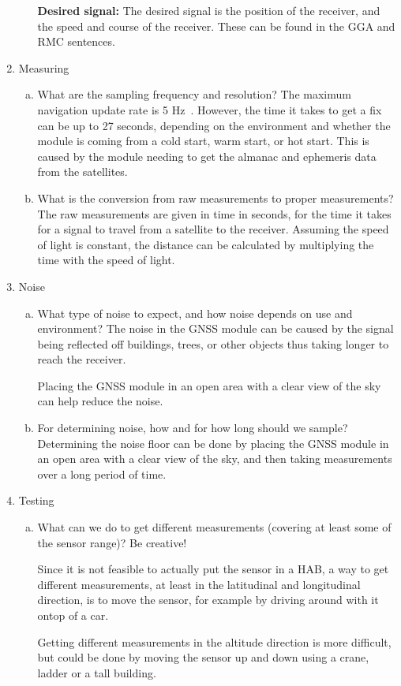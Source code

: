 \begin{enumerate}
\begin{enumerate}[(a)]
        \textbf{Desired signal:}
        The desired signal is the position of the receiver, and the speed and course of the receiver.
        These can be found in the GGA and RMC sentences.
    \end{enumerate}
    \item Measuring
    \begin{enumerate}[(a)]
        \item What are the sampling frequency and resolution?
        The maximum navigation update rate is 5 Hz~\cite{neo-6m}.
        However, the time it takes to get a fix can be up to 27 seconds, depending on the environment and whether the module is coming from a cold start, warm start, or hot start.
        This is caused by the module needing to get the almanac and ephemeris data from the satellites.

        \item What is the conversion from raw measurements to proper measurements?
        The raw measurements are given in time in seconds, for the time it takes for a signal to travel from a satellite to the receiver.
        Assuming the speed of light is constant, the distance can be calculated by multiplying the time with the speed of light.

    \end{enumerate}
    \item Noise
    \begin{enumerate}[(a)]
        \item What type of noise to expect, and how noise depends on use and environment?
        The noise in the GNSS module can be caused by the signal being reflected off buildings, trees, or other objects thus taking longer to reach the receiver.

        Placing the GNSS module in an open area with a clear view of the sky can help reduce the noise.


        \item For determining noise, how and for how long should we sample?
        Determining the noise floor can be done by placing the GNSS module in an open area with a clear view of the sky, and then taking measurements over a long period of time.

    \end{enumerate}
    \item Testing
    \begin{enumerate}[(a)]
        \item What can we do to get different measurements (covering at least some of the sensor range)? Be creative!

        Since it is not feasible to actually put the sensor in a HAB, a way to get different measurements, at least in the latitudinal and longitudinal direction, is to move the sensor, for example by driving around with it ontop of a car.

        Getting different measurements in the altitude direction is more difficult, but could be done by moving the sensor up and down using a crane, ladder or a tall building.
    \end{enumerate}
\end{enumerate}






